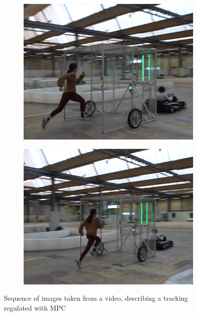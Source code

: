 \documentclass[a4paper,12pt,oneside]{book}
\begin{document}
\begin{figure}[h!]
\begin{subfigure}[b]{0.24\textwidth}
        \includegraphics[width=\textwidth]{SteadyState/ss7.png}
    \end{subfigure}
\hfill
    \begin{subfigure}[b]{0.24\textwidth}
        \includegraphics[width=\textwidth]{SteadyState/ss8.png}
    \end{subfigure}
    \caption{Sequence of images taken from a video, describing a tracking regulated with MPC }
\end{figure}

	  
	





\printbibliography


\end{document}
